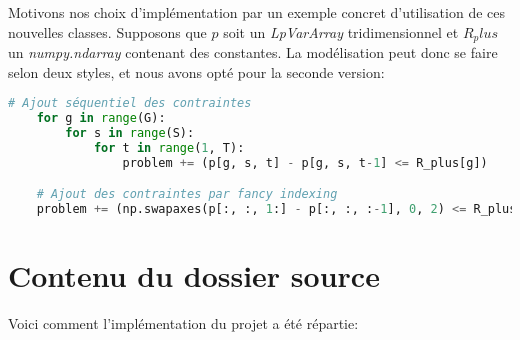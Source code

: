 Motivons nos choix d'implémentation par un exemple concret d'utilisation de ces nouvelles classes.
Supposons que $p$ soit un \textit{LpVarArray} tridimensionnel et $R_plus$ un \textit{numpy.ndarray} contenant 
des constantes. La modélisation peut donc se faire selon deux styles, et nous avons opté pour la seconde
version:
\begin{lstlisting}[language=Python]
    # Ajout séquentiel des contraintes
    for g in range(G):
        for s in range(S):
            for t in range(1, T):
                problem += (p[g, s, t] - p[g, s, t-1] <= R_plus[g])

    # Ajout des contraintes par fancy indexing
    problem += (np.swapaxes(p[:, :, 1:] - p[:, :, :-1], 0, 2) <= R_plus)
\end{lstlisting}

\section{Contenu du dossier source}

Voici comment l'implémentation du projet a été répartie:

